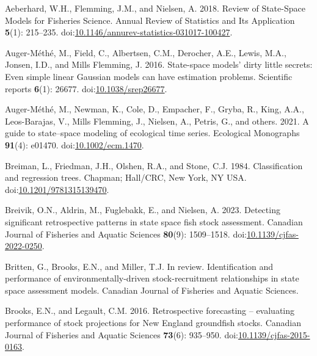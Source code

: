 \documentclass[
  12pt,
]{article}
\newlength{\cslhangindent}
\newlength{\cslentryspacingunit} %
\newenvironment{CSLReferences}[2] %
 {%
  \setlength{\parindent}{0pt}
  \ifodd #1
  \let\oldpar\par
  \def\par{\hangindent=\cslhangindent\oldpar}
  \fi
  \setlength{\parskip}{#2\cslentryspacingunit}
 }%
 {}
\begin{document}
\hypertarget{refs}{}
\begin{CSLReferences}{1}{0}
\leavevmode{}%
Aeberhard, W.H., Flemming, J.M., and Nielsen, A. 2018. Review of
{State}-{Space Models} for {Fisheries Science}. Annual Review of
Statistics and Its Application \textbf{5}(1): 215--235.
doi:\href{https://doi.org/10.1146/annurev-statistics-031017-100427}{10.1146/annurev-statistics-031017-100427}.

\leavevmode{}%
Auger-Méthé, M., Field, C., Albertsen, C.M., Derocher, A.E., Lewis,
M.A., Jonsen, I.D., and Mills Flemming, J. 2016. State-space models'
dirty little secrets: Even simple linear {G}aussian models can have
estimation problems. Scientific reports \textbf{6}(1): 26677.
doi:\href{https://doi.org/10.1038/srep26677}{10.1038/srep26677}.

\leavevmode{}%
Auger-Méthé, M., Newman, K., Cole, D., Empacher, F., Gryba, R., King,
A.A., Leos-Barajas, V., Mills Flemming, J., Nielsen, A., Petris, G., and
others. 2021. A guide to state--space modeling of ecological time
series. Ecological Monographs \textbf{91}(4): e01470.
doi:\href{https://doi.org/10.1002/ecm.1470}{10.1002/ecm.1470}.

\leavevmode{}%
Breiman, L., Friedman, J.H., Olshen, R.A., and Stone, C.J. 1984.
Classification and regression trees. Chapman; Hall/CRC, New York, NY
USA.
doi:\href{https://doi.org/10.1201/9781315139470}{10.1201/9781315139470}.

\leavevmode{}%
Breivik, O.N., Aldrin, M., Fuglebakk, E., and Nielsen, A. 2023.
Detecting significant retrospective patterns in state space fish stock
assessment. Canadian Journal of Fisheries and Aquatic Sciences
\textbf{80}(9): 1509--1518.
doi:\href{https://doi.org/10.1139/cjfas-2022-0250}{10.1139/cjfas-2022-0250}.

\leavevmode{}%
Britten, G., Brooks, E.N., and Miller, T.J. In review. Identification
and performance of environmentally-driven stock-recruitment
relationships in state space assessment models. Canadian Journal of
Fisheries and Aquatic Sciences.

\leavevmode{}%
Brooks, E.N., and Legault, C.M. 2016. Retrospective forecasting --
evaluating performance of stock projections for {N}ew {E}ngland
groundfish stocks. Canadian Journal of Fisheries and Aquatic Sciences
\textbf{73}(6): 935--950.
doi:\href{https://doi.org/10.1139/cjfas-2015-0163}{10.1139/cjfas-2015-0163}.


\end{CSLReferences}
\end{document}
